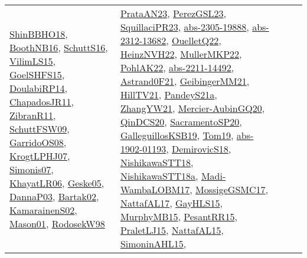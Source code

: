 {\begin{longtable}{lp{3cm}>{\raggedright}p{6cm}>{\raggedright}p{6cm}p{8cm}}
\href{articles/ShinBBHO18.pdf}{ShinBBHO18}\cite{ShinBBHO18}, \href{papers/BoothNB16.pdf}{BoothNB16}\cite{BoothNB16}, \href{papers/SchuttS16.pdf}{SchuttS16}\cite{SchuttS16}, \href{papers/VilimLS15.pdf}{VilimLS15}\cite{VilimLS15}, \href{articles/GoelSHFS15.pdf}{GoelSHFS15}\cite{GoelSHFS15}, \href{papers/DoulabiRP14.pdf}{DoulabiRP14}\cite{DoulabiRP14}, \href{papers/ChapadosJR11.pdf}{ChapadosJR11}\cite{ChapadosJR11}, \href{papers/ZibranR11.pdf}{ZibranR11}\cite{ZibranR11}, \href{papers/SchuttFSW09.pdf}{SchuttFSW09}\cite{SchuttFSW09}, \href{articles/GarridoOS08.pdf}{GarridoOS08}\cite{GarridoOS08}, \href{papers/KrogtLPHJ07.pdf}{KrogtLPHJ07}\cite{KrogtLPHJ07}, \href{articles/Simonis07.pdf}{Simonis07}\cite{Simonis07}, \href{articles/KhayatLR06.pdf}{KhayatLR06}\cite{KhayatLR06}, \href{papers/Geske05.pdf}{Geske05}\cite{Geske05}, \href{papers/DannaP03.pdf}{DannaP03}\cite{DannaP03}, \href{papers/Bartak02.pdf}{Bartak02}\cite{Bartak02}, \href{papers/KamarainenS02.pdf}{KamarainenS02}\cite{KamarainenS02}, \href{articles/Mason01.pdf}{Mason01}\cite{Mason01}, \href{papers/RodosekW98.pdf}{RodosekW98}\cite{RodosekW98} & \href{articles/PrataAN23.pdf}{PrataAN23}\cite{PrataAN23}, \href{papers/PerezGSL23.pdf}{PerezGSL23}\cite{PerezGSL23}, \href{papers/SquillaciPR23.pdf}{SquillaciPR23}\cite{SquillaciPR23}, \href{articles/abs-2305-19888.pdf}{abs-2305-19888}\cite{abs-2305-19888}, \href{articles/abs-2312-13682.pdf}{abs-2312-13682}\cite{abs-2312-13682}, \href{papers/OuelletQ22.pdf}{OuelletQ22}\cite{OuelletQ22}, \href{articles/HeinzNVH22.pdf}{HeinzNVH22}\cite{HeinzNVH22}, \href{articles/MullerMKP22.pdf}{MullerMKP22}\cite{MullerMKP22}, \href{articles/PohlAK22.pdf}{PohlAK22}\cite{PohlAK22}, \href{articles/abs-2211-14492.pdf}{abs-2211-14492}\cite{abs-2211-14492}, \href{papers/Astrand0F21.pdf}{Astrand0F21}\cite{Astrand0F21}, \href{papers/GeibingerMM21.pdf}{GeibingerMM21}\cite{GeibingerMM21}, \href{papers/HillTV21.pdf}{HillTV21}\cite{HillTV21}, \href{articles/PandeyS21a.pdf}{PandeyS21a}\cite{PandeyS21a}, \href{articles/ZhangYW21.pdf}{ZhangYW21}\cite{ZhangYW21}, \href{papers/Mercier-AubinGQ20.pdf}{Mercier-AubinGQ20}\cite{Mercier-AubinGQ20}, \href{articles/QinDCS20.pdf}{QinDCS20}\cite{QinDCS20}, \href{articles/SacramentoSP20.pdf}{SacramentoSP20}\cite{SacramentoSP20}, \href{papers/GalleguillosKSB19.pdf}{GalleguillosKSB19}\cite{GalleguillosKSB19}, \href{papers/Tom19.pdf}{Tom19}\cite{Tom19}, \href{articles/abs-1902-01193.pdf}{abs-1902-01193}\cite{abs-1902-01193}, \href{papers/DemirovicS18.pdf}{DemirovicS18}\cite{DemirovicS18}, \href{papers/NishikawaSTT18.pdf}{NishikawaSTT18}\cite{NishikawaSTT18}, \href{papers/NishikawaSTT18a.pdf}{NishikawaSTT18a}\cite{NishikawaSTT18a}, \href{papers/Madi-WambaLOBM17.pdf}{Madi-WambaLOBM17}\cite{Madi-WambaLOBM17}, \href{papers/MossigeGSMC17.pdf}{MossigeGSMC17}\cite{MossigeGSMC17}, \href{articles/NattafAL17.pdf}{NattafAL17}\cite{NattafAL17}, \href{papers/GayHLS15.pdf}{GayHLS15}\cite{GayHLS15}, \href{papers/MurphyMB15.pdf}{MurphyMB15}\cite{MurphyMB15}, \href{papers/PesantRR15.pdf}{PesantRR15}\cite{PesantRR15}, \href{papers/PraletLJ15.pdf}{PraletLJ15}\cite{PraletLJ15}, \href{articles/NattafAL15.pdf}{NattafAL15}\cite{NattafAL15}, \href{articles/SimoninAHL15.pdf}{SimoninAHL15}\cite{SimoninAHL15}, 
\end{longtable}}
